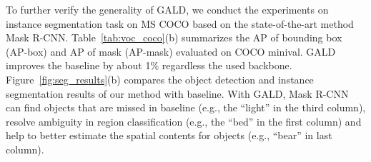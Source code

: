 \documentclass{bmvc2k}
\begin{document}
To further verify the generality of GALD, we conduct the experiments on instance segmentation task on MS COCO based on the state-of-the-art method Mask R-CNN. 
Table~\ref{tab:voc_coco}(b) summarizes the AP of bounding box (AP-box) and AP of mask (AP-mask) evaluated on COCO minival. GALD improves the baseline by about 1\% regardless the used backbone. 
Figure~\ref{fig:seg_results}(b) compares the object detection and instance segmentation results of our method with baseline. With GALD, Mask R-CNN can find objects that are missed in baseline (e.g., the ``light'' in the third column), resolve ambiguity in region classification (e.g., the ``bed'' in the first column) and help to better estimate the spatial contents for objects (e.g., ``bear'' in last column).
\end{document}
